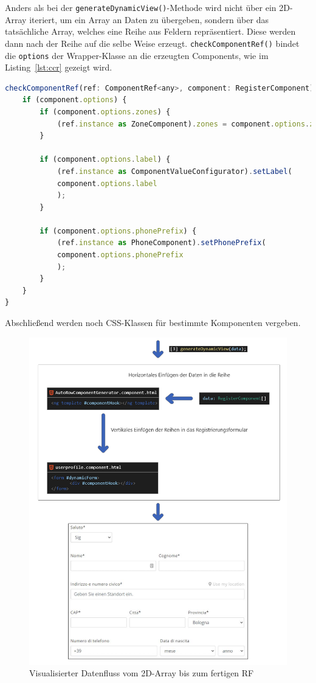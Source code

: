 Anders als bei der \texttt{generateDynamicView()}-Methode wird nicht über ein 2D-Array iteriert, um ein Array an Daten zu übergeben, sondern über das tatsächliche Array, welches eine Reihe aus Feldern repräsentiert. Diese werden dann nach der Reihe auf die selbe Weise erzeugt. \texttt{checkComponentRef()} bindet die \texttt{options} der Wrapper-Klasse an die erzeugten Components, wie im Listing~\ref{lst:ccr} gezeigt wird.

\newpage

\begin{lstlisting}[caption={Die \texttt{checkComponentRef()}-Methode der \texttt{AutoRowComponentGenerator}-Klasse},captionpos=b, language=JavaScript,label={lst:ccr}]
checkComponentRef(ref: ComponentRef<any>, component: RegisterComponent) {
	if (component.options) {
		if (component.options.zones) {
			(ref.instance as ZoneComponent).zones = component.options.zones;
		}
		
		if (component.options.label) {
			(ref.instance as ComponentValueConfigurator).setLabel(
			component.options.label
			);
		}
		
		if (component.options.phonePrefix) {
			(ref.instance as PhoneComponent).setPhonePrefix(
			component.options.phonePrefix
			);
		}
	}
}
\end{lstlisting}

Abschließend werden noch CSS-Klassen für bestimmte Komponenten vergeben.

\begin{figure}[H]
	\centerline{
		\includegraphics[width=1\textwidth, frame]{./grafiken/RF_Visualisierter Ablauf_2.png}
	}
	\vskip0pt
	\caption{Visualisierter Datenfluss vom 2D-Array bis zum fertigen RF}
\end{figure}

